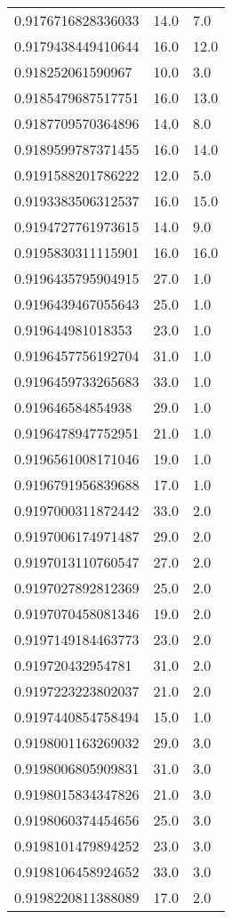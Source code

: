 \begin{center}
\begin{supertabular}[H]{p{0.30\textwidth}p{0.05\textwidth}p{0.05\textwidth}}
0.9176716828336033 & 14.0 & 7.0 \\ 
0.9179438449410644 & 16.0 & 12.0 \\ 
0.918252061590967 & 10.0 & 3.0 \\ 
0.9185479687517751 & 16.0 & 13.0 \\ 
0.9187709570364896 & 14.0 & 8.0 \\ 
0.9189599787371455 & 16.0 & 14.0 \\ 
0.9191588201786222 & 12.0 & 5.0 \\ 
0.9193383506312537 & 16.0 & 15.0 \\ 
0.9194727761973615 & 14.0 & 9.0 \\ 
0.9195830311115901 & 16.0 & 16.0 \\ 
0.9196435795904915 & 27.0 & 1.0 \\ 
0.9196439467055643 & 25.0 & 1.0 \\ 
0.919644981018353 & 23.0 & 1.0 \\ 
0.9196457756192704 & 31.0 & 1.0 \\ 
0.9196459733265683 & 33.0 & 1.0 \\ 
0.919646584854938 & 29.0 & 1.0 \\ 
0.9196478947752951 & 21.0 & 1.0 \\ 
0.9196561008171046 & 19.0 & 1.0 \\ 
0.9196791956839688 & 17.0 & 1.0 \\ 
0.9197000311872442 & 33.0 & 2.0 \\ 
0.9197006174971487 & 29.0 & 2.0 \\ 
0.9197013110760547 & 27.0 & 2.0 \\ 
0.9197027892812369 & 25.0 & 2.0 \\ 
0.9197070458081346 & 19.0 & 2.0 \\ 
0.9197149184463773 & 23.0 & 2.0 \\ 
0.919720432954781 & 31.0 & 2.0 \\ 
0.9197223223802037 & 21.0 & 2.0 \\ 
0.9197440854758494 & 15.0 & 1.0 \\ 
0.9198001163269032 & 29.0 & 3.0 \\ 
0.9198006805909831 & 31.0 & 3.0 \\ 
0.9198015834347826 & 21.0 & 3.0 \\ 
0.9198060374454656 & 25.0 & 3.0 \\ 
0.9198101479894252 & 23.0 & 3.0 \\ 
0.9198106458924652 & 33.0 & 3.0 \\ 
0.9198220811388089 & 17.0 & 2.0 \\ 

\end{supertabular}
\end{center}
